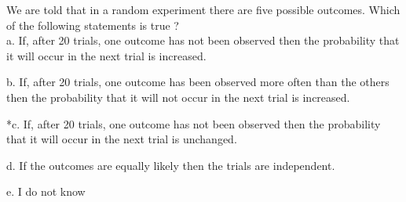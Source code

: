 
We are told that in a random experiment there are five possible
outcomes. Which of the following statements is true ? \\

a. If, after 20 trials, one outcome has not been observed then the
probability that it will occur in the next trial is increased.

b. If, after 20 trials, one outcome has been observed more often than
the others then the probability that it will not occur in the next trial
is increased.

*c. If, after 20 trials, one outcome has not been observed then the
probability that it will occur in the next trial is unchanged.

d. If the outcomes are equally likely then the trials are independent.

e. I do not know \\

